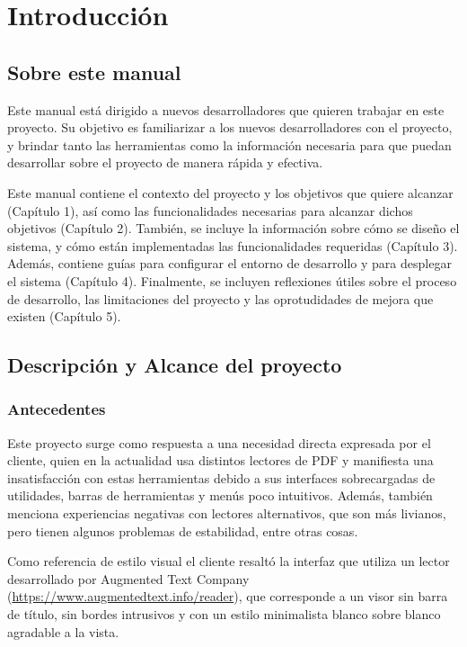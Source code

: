 \chapter{Introducción}

\section{Sobre este manual}

Este manual está dirigido a nuevos desarrolladores que quieren trabajar en este proyecto. Su objetivo es familiarizar a los nuevos desarrolladores con el proyecto, y brindar tanto las herramientas como la información necesaria para que puedan desarrollar sobre el proyecto de manera rápida y efectiva.

Este manual contiene el contexto del proyecto y los objetivos que quiere alcanzar (Capítulo 1), así como las funcionalidades necesarias para alcanzar dichos objetivos (Capítulo 2). También, se incluye la información sobre cómo se diseño el sistema, y cómo están implementadas las funcionalidades requeridas (Capítulo 3). Además, contiene guías para configurar el entorno de desarrollo y para desplegar el sistema (Capítulo 4). Finalmente, se incluyen reflexiones útiles sobre el proceso de desarrollo, las limitaciones del proyecto y las oprotudidades de mejora que existen (Capítulo 5).

\section{Descripción y Alcance del proyecto}
\subsection{Antecedentes}

Este proyecto surge como respuesta a una necesidad directa expresada por el cliente, quien en la actualidad usa distintos lectores de PDF y manifiesta una insatisfacción con estas herramientas debido a sus interfaces sobrecargadas de utilidades, barras de herramientas y menús poco intuitivos. Además, también menciona experiencias negativas con lectores alternativos, que son más livianos, pero tienen algunos problemas de estabilidad, entre otras cosas.

Como referencia de estilo visual el cliente resaltó la interfaz que utiliza un lector desarrollado por Augmented Text Company (\url{https://www.augmentedtext.info/reader}), que corresponde a un visor sin barra de título, sin bordes intrusivos y con un estilo minimalista blanco sobre blanco agradable a la vista.

